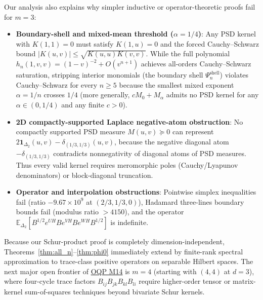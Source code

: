 \documentclass[11pt,a4paper]{article}
\theoremstyle{remark}
\begin{document}
Our analysis also explains why simpler inductive or operator-theoretic proofs fail for $m=3$:
\begin{itemize}
  \item \textbf{Boundary-shell and mixed-mean threshold ($\alpha = 1/4$)}: Any PSD kernel with $K(1,1)=0$ must satisfy $K(1,u)=0$ and the forced Cauchy--Schwarz bound $|K(u,v)|\le\sqrt{K(u,u)K(v,v)}$. While the full polynomial $h_n(1,v,v)=(1-v)^{-2}+O(v^{n+1})$ achieves all-orders Cauchy--Schwarz saturation, stripping interior monomials (the boundary shell $\Psi_n^{\mathrm{shell}}$) violates Cauchy--Schwarz for every $n\ge 5$ because the smallest mixed exponent $\alpha=1/n$ crosses $1/4$ (more generally, $c M_0 + M_\alpha$ admits no PSD kernel for any $\alpha\in(0,1/4)$ and any finite $c>0$).
  \item \textbf{2D compactly-supported Laplace negative-atom obstruction}: No compactly supported PSD measure $M(u,v)\succeq 0$ can represent $2\mathbf{1}_{\Delta_2}(u,v)-\delta_{(1/3,1/3)}(u,v)$, because the negative diagonal atom $-\delta_{(1/3,1/3)}$ contradicts nonnegativity of diagonal atoms of PSD measures. Thus every valid kernel requires meromorphic poles (Cauchy/Lyapunov denominators) or block-diagonal truncation.
  \item \textbf{Operator and interpolation obstructions}: Pointwise simplex inequalities fail (ratio $-9.67\times 10^9$ at $(2/3,1/3,0)$), Hadamard three-lines boundary bounds fail (modulus ratio $>4150$), and the operator $\mathbb{E}_{\Delta_2}[B^{1/2}e^{UH}Be^{VH}Be^{WH}B^{1/2}]$ is indefinite.
\end{itemize}
Because our Schur-product proof is completely dimension-independent, Theorems~\ref{thm:all_n}--\ref{thm:phi0} immediately extend by finite-rank spectral approximation to trace-class positive operators on separable Hilbert spaces. The next major open frontier of \href{https://openquantumproblems.com/p/M14}{OQP M14} is $m=4$ (starting with $(4,4)$ at $d=3$), where four-cycle trace factors $B_{ij}B_{jk}B_{kl}B_{li}$ require higher-order tensor or matrix-kernel sum-of-squares techniques beyond bivariate Schur kernels.
\end{document}
